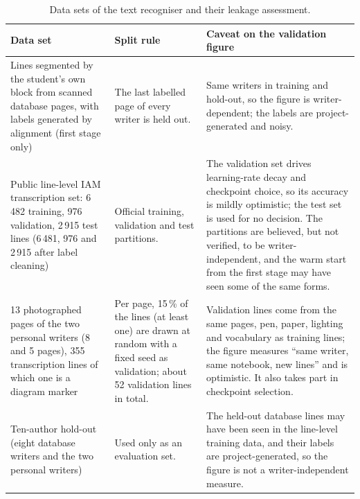 \begin{table}[h]
\centering
\fontsize{9.5}{11.5}\selectfont
\begin{tabularx}{\linewidth}{|p{2.8cm}|p{3.6cm}|X|}
\hline
\textbf{Data set} & \textbf{Split rule} & \textbf{Caveat on the validation figure} \\
\hline
Lines segmented by the student's own block from scanned database pages, with labels generated by alignment (first stage only) &
The last labelled page of every writer is held out. &
Same writers in training and hold-out, so the figure is writer-dependent; the labels are project-generated and noisy. \\
\hline
Public line-level IAM transcription set: 6\,482 training, 976 validation, 2\,915 test lines (6\,481, 976 and 2\,915 after label cleaning) &
Official training, validation and test partitions. &
The validation set drives learning-rate decay and checkpoint choice, so its accuracy is mildly optimistic; the test set is used for no decision. The partitions are believed, but not verified, to be writer-independent, and the warm start from the first stage may have seen some of the same forms. \\
\hline
13 photographed pages of the two personal writers (8 and 5 pages), 355 transcription lines of which one is a diagram marker &
Per page, 15\,\% of the lines (at least one) are drawn at random with a fixed seed as validation; about 52 validation lines in total. &
Validation lines come from the same pages, pen, paper, lighting and vocabulary as training lines; the figure measures ``same writer, same notebook, new lines'' and is optimistic. It also takes part in checkpoint selection. \\
\hline
Ten-author hold-out (eight database writers and the two personal writers) &
Used only as an evaluation set. &
The held-out database lines may have been seen in the line-level training data, and their labels are project-generated, so the figure is not a writer-independent measure. \\
\hline
\end{tabularx}
\caption{Data sets of the text recogniser and their leakage assessment.}
\label{tab:rec-data}
\end{table}

